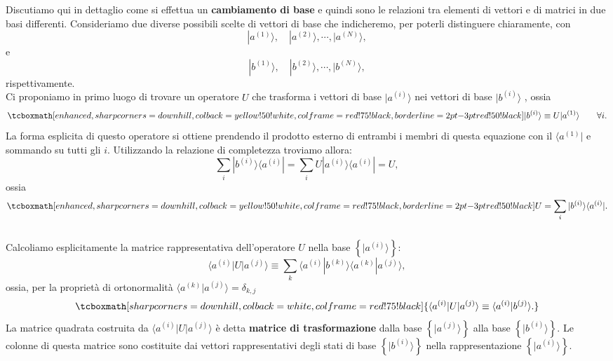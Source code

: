 \documentclass[a4paper,12pt,oneside]{book}
\begin{document}
Discutiamo qui in dettaglio come si effettua un \textbf{cambiamento di base} e quindi sono le relazioni tra elementi di vettori e di matrici in due basi differenti. Consideriamo due diverse possibili scelte di vettori di base che indicheremo, per poterli distinguere chiaramente, con 
	\begin{equation}
		| a^{(1)} \rangle , \quad  | a^{(2)} \rangle , \cdots , | a^{(N)} \rangle ,
	\end{equation}
e
	\begin{equation}
		| b^{(1)} \rangle , \quad | b^{(2)} \rangle , \cdots , | b^{(N)} \rangle ,
	\end{equation}
rispettivamente. \\

Ci proponiamo in primo luogo di trovare un operatore $U$ che trasforma i vettori di base $| a^{(i)} \rangle$ nei vettori di base $| b^{(i)} \rangle $ , ossia 
	\begin{equation}
		\tcboxmath[enhanced,sharp corners=downhill ,colback=yellow!50!white,colframe=red!75!black, borderline={2pt}{-3pt}{red!50!black}]{	
			| b^{(i)} \rangle \equiv U | a^{(1)} \rangle 
			}\qquad \forall i .
	\end{equation}
La forma esplicita di questo operatore si ottiene prendendo il prodotto esterno di entrambi i membri di questa equazione con il $\langle a^{(1)}| $ e sommando su tutti gli $i$. Utilizzando la relazione di completezza troviamo allora:
	\begin{equation}
		\sum \limits_{i} | b^{(i)} \rangle \langle a^{(i)} |  = \sum \limits_{i} U | a^{(i)} \rangle \langle a^{(i)} |  = U ,
	\end{equation}
ossia
	\begin{equation}
		\tcboxmath[enhanced,sharp corners=downhill ,colback=yellow!50!white,colframe=red!75!black, borderline={2pt}{-3pt}{red!50!black}]{
			U = \sum \limits_{i} | b^{(i)} \rangle \langle a^{(i)} | .
			}
	\end{equation}\\

Calcoliamo esplicitamente la matrice rappresentativa dell'operatore $U$ nella base $\left\{ | a^{(i)} \rangle    \right\} $:
	\begin{equation}
			\langle a^{(i)} | U | a^{(j)} \rangle \equiv \sum \limits_{k} \langle a^{(i)} | b^{(k)} \rangle  \langle a^{(k)} | a^{(j)} \rangle  ,
	\end{equation}
ossia, per la proprietà di ortonormalità $\langle a^{(k)} | a^{(j)} \rangle  =\delta_{k,j}$
	\begin{equation}
		\tcboxmath[sharp corners=downhill ,colback=white,colframe=red!75!black]{
			\langle a^{(i)} | U | a^{(j)} \rangle \equiv \langle a^{(i)} | b^{(j)} \rangle .
			}
	\end{equation}
La matrice quadrata costruita da $\langle a^{(i)} | U | a^{(j)} \rangle $ è detta \textbf{matrice di trasformazione} dalla base $\left\{ | a^{(j)} \rangle  \right\}$ alla base $\left\{ | b^{(i)} \rangle  \right\}$. Le colonne di questa matrice sono costituite dai vettori rappresentativi degli stati di base $\left\{ | b^{(i)} \rangle  \right\}$ nella rappresentazione $\left\{ | a^{(i)} \rangle  \right\}$.\\
\end{document}
